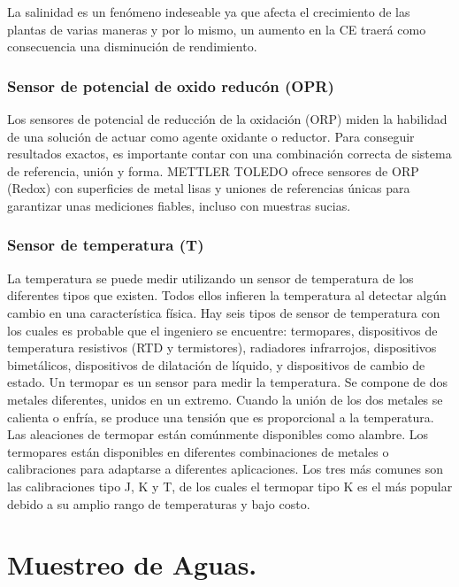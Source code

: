La salinidad es un fenómeno indeseable ya que afecta el crecimiento de las plantas  de varias maneras y por lo mismo, un aumento en la CE traerá como consecuencia una disminución de rendimiento.


\subsubsection{Sensor de potencial de oxido reduc\'on (OPR)}
Los sensores de potencial de reducción de la oxidación (ORP) miden la habilidad de una solución de actuar como agente oxidante o reductor. Para conseguir resultados exactos, es importante contar con una combinación correcta de sistema de referencia, unión y forma. METTLER TOLEDO ofrece sensores de ORP (Redox) con superficies de metal lisas y uniones de referencias únicas para garantizar unas mediciones fiables, incluso con muestras sucias.



\subsubsection{Sensor de temperatura (T)}
La temperatura se puede medir utilizando un sensor de temperatura de los diferentes tipos que existen. Todos ellos infieren la temperatura al detectar algún cambio en una característica física. Hay seis tipos de sensor de temperatura con los cuales es probable que el ingeniero se encuentre: termopares, dispositivos de temperatura resistivos (RTD y termistores), radiadores infrarrojos, dispositivos bimetálicos, dispositivos de dilatación de l\'iquido, y dispositivos de cambio de estado.
Un termopar es un sensor para medir la temperatura. Se compone de dos metales diferentes, unidos en un extremo. Cuando la unión de los dos metales se calienta o enfría, se produce una tensión que es proporcional a la temperatura. Las aleaciones de termopar están comúnmente disponibles como alambre.
Los termopares est\'an disponibles en diferentes combinaciones de metales o calibraciones para adaptarse a diferentes aplicaciones. Los tres más comunes son las calibraciones tipo J, K y T, de los cuales el termopar tipo K es el más popular debido a su amplio rango de temperaturas y bajo costo.


\section{Muestreo de Aguas.}



